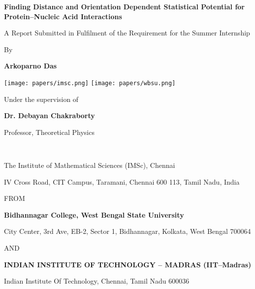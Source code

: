 \documentclass[12pt,a4paper]{report}
\begin{document}
\begin{titlepage}
\centering
{\Large\bfseries Finding Distance and Orientation Dependent Statistical Potential for Protein–Nucleic Acid Interactions\par}
\vspace{0.5cm}
{\normalsize A Report Submitted in Fulfilment of the Requirement for the Summer Internship\par}
\vspace{0.5cm}
{\large By\par}
{\bfseries Arkoparno Das\par}
\vspace{0.5cm}

\texttt{[image: papers/imsc.png]} \hspace{1cm}
\texttt{[image: papers/wbsu.png]}

\vspace{4 cm}
{\large Under the supervision of\par}
{\bfseries Dr. Debayan Chakraborty\par}
{\normalsize Professor, Theoretical Physics\par}\
{\normalsize The Institute of Mathematical Sciences (IMSc), Chennai\par}
{\footnotesize IV Cross Road, CIT Campus, Taramani, Chennai 600 113, Tamil Nadu, India\par}

\vspace{0.8cm}
{\large FROM\par}
{\bfseries Bidhannagar College, West Bengal State University\par}
{\footnotesize City Center, 3rd Ave, EB-2, Sector 1, Bidhannagar, Kolkata, West Bengal 700064\par}

\vspace{0.5 cm}
{\large AND \par}
{\bfseries INDIAN INSTITUTE OF TECHNOLOGY -- MADRAS (IIT–Madras)\par}
{\footnotesize Indian Institute Of Technology, Chennai, Tamil Nadu 600036\par}

\vfill

\end{titlepage}

\setcounter{tocdepth}{2} %
\tableofcontents
\newpage
\end{document}
